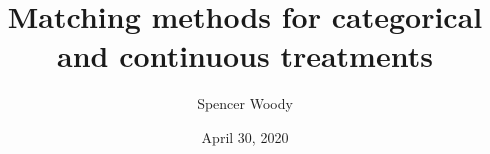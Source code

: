 




\newcommand{\backupbegin}{
   \newcounter{finalframe}
   \setcounter{finalframe}{\value{framenumber}}
}
\newcommand{\backupend}{
   \setcounter{framenumber}{\value{finalframe}}
}




\title[Nonbinary treatments]{Matching methods for categorical and
  continuous treatments} %


\newcommand{\graphic}{1}


\author{Spencer Woody}







\date{April 30, 2020} 











\newcommand{\CATE}[0]{\text{CATE}}
\newcommand{\cov}[0]{\text{cov}}



